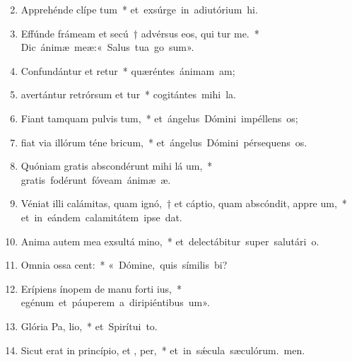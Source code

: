 \begin{flushleft}
\begin{enumerate}[leftmargin=*]
\setcounter{enumi}{1}

\item Apprehénde clípe  tum~* \mbox{et exsúrge in adiutórium hi.}

\item Effúnde frámeam et secú~† advérsus eos, qui tur me.~* \mbox{Dic ánimæ meæ:« Salus tua go sum».}

\item Confundántur et retur~* \mbox{quæréntes ánimam am;}

\item avertántur retrórsum et tur~* \mbox{cogitántes mihi la.}

\item Fiant tamquam pulvis  tum,~* \mbox{et ángelus Dómini impéllens os;}

\item fiat via illórum téne  bricum,~* \mbox{et ángelus Dómini pérsequens os.}

\item Quóniam gratis abscondérunt mihi lá um,~* \mbox{gratis fodérunt fóveam ánimæ æ.}

\item Véniat illi calámitas, quam ignó,~† et cáptio, quam abscóndit, appre um,~* \mbox{et in eándem calamitátem ipse dat.}

\item Anima autem mea exsultá  mino,~* \mbox{et delectábitur super salutári o.}

\item Omnia ossa  cent:~* \mbox{« Dómine, quis símilis bi?}

\item Erípiens ínopem de manu forti ius,~* \mbox{egénum et páuperem a diripiéntibus um».}

\item Glória Pa,  lio,~* \mbox{et Spirítui to.}

\item Sicut erat in princípio, et ,  per,~* \mbox{et in s\'{\ae}cula sæculórum. men.}

\end{enumerate}
\end{flushleft}

